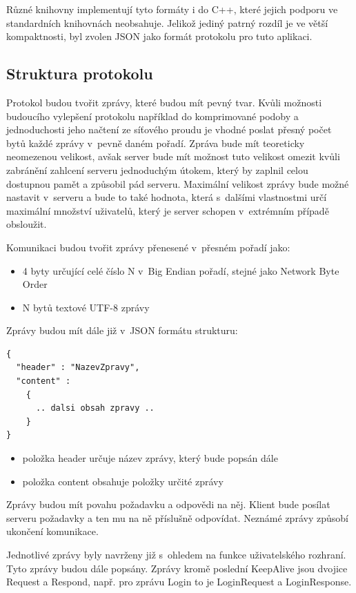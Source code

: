 \documentclass[thesis=B,czech]{FITthesis}[2013/10/20]
\begin{document}
Různé knihovny implementují tyto formáty i do C++, které jejich podporu ve standardních knihovnách neobsahuje. Jelikož jediný patrný rozdíl je ve větší kompaktnosti, byl zvolen JSON jako formát protokolu pro tuto aplikaci.

\subsection{Struktura protokolu}

Protokol budou tvořit zprávy, které budou mít pevný tvar. Kvůli možnosti budoucího vylepšení protokolu například do komprimované podoby a jednoduchosti jeho načtení ze síťového proudu je vhodné poslat přesný počet bytů každé zprávy v~pevně daném pořadí. Zpráva bude mít teoreticky neomezenou velikost, avšak server bude mít možnost tuto velikost omezit kvůli zabránění zahlcení serveru jednoduchým útokem, který by zaplnil celou dostupnou pamět a způsobil pád serveru. Maximální velikost zprávy bude možné nastavit v~serveru a bude to také hodnota, která s~dalšími vlastnostmi určí maximální množství uživatelů, který je server schopen v~extrémním případě obsloužit.

Komunikaci budou tvořit zprávy přenesené v~přesném pořadí jako:

\begin{itemize}
  \item{4 byty určující celé číslo N v~Big Endian pořadí, stejné jako Network Byte Order}
  \item{N bytů textové UTF-8 zprávy}
\end{itemize}

Zprávy budou mít dále již v~JSON formátu strukturu:
\begin{lstlisting}
{
  "header" : "NazevZpravy",
  "content" :
    {
      .. dalsi obsah zpravy ..
    }
}
\end{lstlisting}

\begin{itemize}
  \item{položka header určuje název zprávy, který bude popsán dále}
  \item{položka content obsahuje položky určité zprávy}
\end{itemize}

Zprávy budou mít povahu požadavku a odpovědi na něj. Klient bude posílat serveru požadavky a ten mu na ně příslušně odpovídat. Neznámé zprávy způsobí ukončení komunikace.

Jednotlivé zprávy byly navrženy již s~ohledem na funkce uživatelského rozhraní. Tyto zprávy budou dále popsány. Zprávy kromě poslední KeepAlive jsou dvojice Request a Respond, např. pro zprávu Login to je LoginRequest a LoginResponse.
\end{document}
